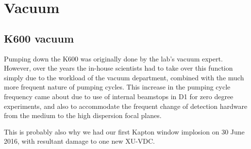 \documentclass[11pt]{report}
\begin{document}
\chapter{Vacuum}\label{chap:Vacuum}

\section{K600 vacuum}

Pumping down the K600 was originally done by the lab's vacuum expert. However, over the years
the in-house scientists had to take over this function simply due to the workload of the vacuum department,
combined with the much more frequent nature of pumping cycles. This increase in 
the pumping cycle frequency came about due to use of internal beamstops in D1 for zero degree experiments,
and also to accommodate the frequent change of detection hardware from the medium to the high dispersion focal planes.

This is probably also why we had our first Kapton window implosion on 30 June 2016, with resultant
damage to one new XU-VDC.
\end{document}
